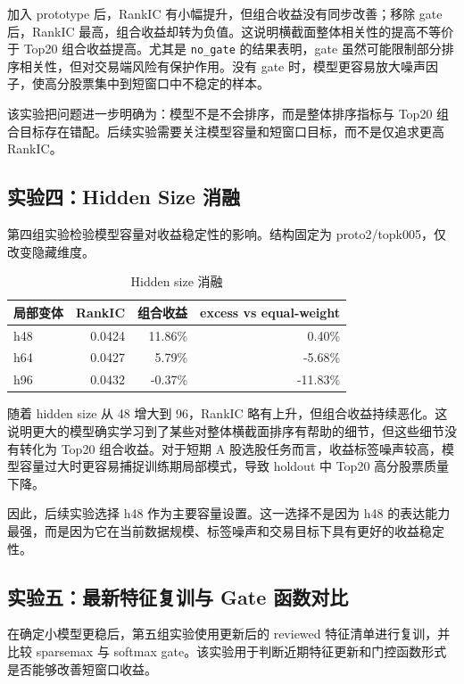 \documentclass[UTF8,a4paper,12pt,fontset=none]{ctexart}
\begin{document}
加入 prototype 后，RankIC 有小幅提升，但组合收益没有同步改善；移除 gate 后，RankIC 最高，组合收益却转为负值。这说明横截面整体相关性的提高不等价于 Top20 组合收益提高。尤其是 \texttt{no\_gate} 的结果表明，gate 虽然可能限制部分排序相关性，但对交易端风险有保护作用。没有 gate 时，模型更容易放大噪声因子，使高分股票集中到短窗口中不稳定的样本。

该实验把问题进一步明确为：模型不是不会排序，而是整体排序指标与 Top20 组合目标存在错配。后续实验需要关注模型容量和短窗口目标，而不是仅追求更高 RankIC。

\subsection{实验四：Hidden Size 消融}

第四组实验检验模型容量对收益稳定性的影响。结构固定为 proto2/topk005，仅改变隐藏维度。

\begin{table}[H]
  \centering
  \caption{Hidden size 消融}
  \label{tab:hidden_size_ablation}
  \begin{tabular}{lrrr}
    \toprule
    局部变体 & RankIC & 组合收益 & excess vs equal-weight \\
    \midrule
    h48 & 0.0424 & 11.86\% & 0.40\% \\
    h64 & 0.0427 & 5.79\% & -5.68\% \\
    h96 & 0.0432 & -0.37\% & -11.83\% \\
    \bottomrule
  \end{tabular}
\end{table}

随着 hidden size 从 48 增大到 96，RankIC 略有上升，但组合收益持续恶化。这说明更大的模型确实学习到了某些对整体横截面排序有帮助的细节，但这些细节没有转化为 Top20 组合收益。对于短期 A 股选股任务而言，收益标签噪声较高，模型容量过大时更容易捕捉训练期局部模式，导致 holdout 中 Top20 高分股票质量下降。

因此，后续实验选择 h48 作为主要容量设置。这一选择不是因为 h48 的表达能力最强，而是因为它在当前数据规模、标签噪声和交易目标下具有更好的收益稳定性。

\subsection{实验五：最新特征复训与 Gate 函数对比}

在确定小模型更稳后，第五组实验使用更新后的 reviewed 特征清单进行复训，并比较 sparsemax 与 softmax gate。该实验用于判断近期特征更新和门控函数形式是否能够改善短窗口收益。
\end{document}
